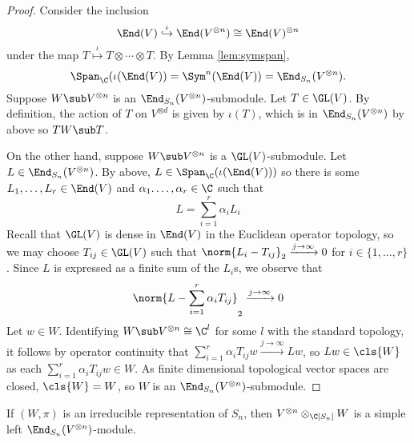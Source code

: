\documentclass[../main.tex]{subfiles}
\begin{document}
\begin{proof}
    Consider the inclusion
    \[
        \End(V) \overset{\iota}{\hookrightarrow} \End(V^{\otimes n}) \cong \End(V)^{\otimes n}
    \]
    under the map $ T\overset{\iota}{\mapsto} T\otimes \cdots \otimes T $. By Lemma \ref{lem:symspan}, 
    \[ 
        \Span_{\C}(\iota(\End(V)) = \Sym^{n}(\End(V)) = \End_{S_{n}}(V^{\otimes n}).
    \]
    Suppose $ W\sub V^{\otimes n} $ is an $ \End_{S_{n}}(V^{\otimes n}) $-submodule. Let $ T\in \GL(V) $. By definition, the action of $ T $ on $ V^{\otimes d} $ is given by $ \iota(T) $, which is in $ \End_{S_{n}}(V^{\otimes n}) $ by above so $ TW\sub T $.

    On the other hand, suppose $ W\sub V^{\otimes n} $ is a $ \GL(V) $-submodule. Let $ L\in \End_{S_{n}}(V^{\otimes n}) $. By above, $ L\in \Span_{\C}(\iota(\End(V))) $ so there is some $ L_{1},\ldots, L_{r}\in \End(V) $ and $ \alpha_{1}.\ldots, \alpha_{r}\in \C $ such that 
    \[
        L = \sum_{i=1}^{r} \alpha_{i} L_{i}
    \]
    Recall that $ \GL(V) $ is dense in $ \End(V) $ in the Euclidean operator topology, so we may choose $ T_{ij}\in \GL(V) $ such that $ \norm{L_{i}-T_{ij}}_{2}\xrightarrow{j\to\infty} 0 $ for $ i\in \{1,\ldots, r\} $. Since $ L $ is expressed as a finite sum of the $ L_{i} $s, we observe that
    \[
        \norm{L - \sum_{i=1}^{r} \alpha_{i} T_{ij}}_{2}\xrightarrow{j\to\infty} 0
    \]
    Let $ w\in W $. Identifying $W\sub V^{\otimes n}\cong \C^{l} $ for some $ l $ with the standard topology, it follows by operator continuity that $ \sum_{i=1}^{r} \alpha_{i} T_{ij} w \xrightarrow{j\to\infty} Lw $, so $ Lw\in \cls{W} $ as each $ \sum_{i=1}^{r} \alpha_{i}T_{ij} w\in W $. As finite dimensional topological vector spaces are closed, $ \cls{W}=W $, so $ W $ is an $ \End_{S_{n}}(V^{\otimes n}) $-submodule.
    
\end{proof}

\begin{lemma}
    If $ (W,\pi) $ is an irreducible representation of $ S_{n} $, then $ V^{\otimes n} \otimes_{\C[S_{n}]} W $ is a simple left $ \End_{S_{n}}(V^{\otimes n}) $-module. 
\end{lemma}
\end{document}
